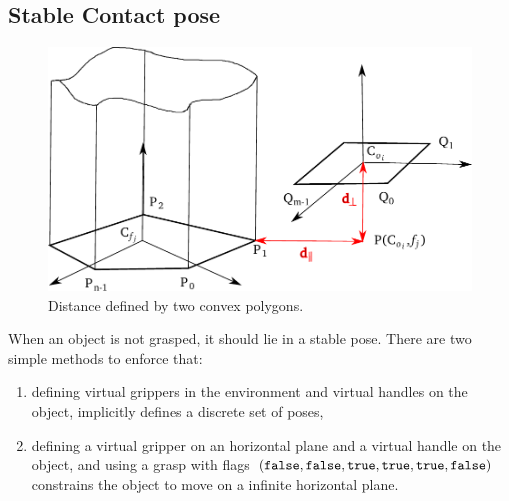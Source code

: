 \subsection{Stable Contact pose}\label{subsec:placement}

\begin{figure}
  \begin{center}
    \includegraphics[width=\linewidth]{figures/convex-shape-contact.pdf}
  \end{center}
  \caption{Distance defined by two convex polygons.}
  \label{fig:convex-shape-contact}
\end{figure}

When an object is not grasped, it should lie in a stable pose. There are two simple methods to enforce that:
\begin{enumerate}
\item defining virtual grippers in the environment and virtual handles on the object, implicitly defines a discrete set of poses,
\item defining a virtual gripper on an horizontal plane and a virtual handle on the object, and using a grasp with flags $(\texttt{false},\texttt{false},\texttt{true},\texttt{true},\texttt{true},\texttt{false})$ constrains the object to move on a infinite horizontal plane.
\end{enumerate}

